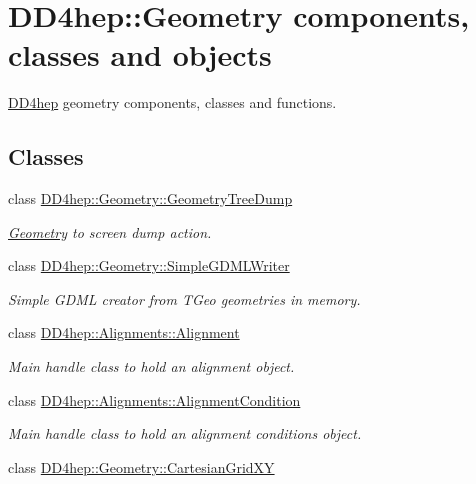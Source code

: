\hypertarget{group___d_d4_h_e_p___g_e_o_m_e_t_r_y}{
\section{DD4hep::Geometry components, classes and objects}
\label{group___d_d4_h_e_p___g_e_o_m_e_t_r_y}
}


\hyperlink{namespace_d_d4hep}{DD4hep} geometry components, classes and functions.  
\subsection*{Classes}
\begin{DoxyCompactItemize}
\item 
class \hyperlink{class_d_d4hep_1_1_geometry_1_1_geometry_tree_dump}{DD4hep::Geometry::GeometryTreeDump}
\begin{DoxyCompactList}\small\item\em \hyperlink{namespace_d_d4hep_1_1_geometry}{Geometry} to screen dump action. \item\end{DoxyCompactList}\item 
class \hyperlink{class_d_d4hep_1_1_geometry_1_1_simple_g_d_m_l_writer}{DD4hep::Geometry::SimpleGDMLWriter}
\begin{DoxyCompactList}\small\item\em Simple GDML creator from TGeo geometries in memory. \item\end{DoxyCompactList}\item 
class \hyperlink{class_d_d4hep_1_1_alignments_1_1_alignment}{DD4hep::Alignments::Alignment}
\begin{DoxyCompactList}\small\item\em Main handle class to hold an alignment object. \item\end{DoxyCompactList}\item 
class \hyperlink{class_d_d4hep_1_1_alignments_1_1_alignment_condition}{DD4hep::Alignments::AlignmentCondition}
\begin{DoxyCompactList}\small\item\em Main handle class to hold an alignment conditions object. \item\end{DoxyCompactList}\item 
class \hyperlink{class_d_d4hep_1_1_geometry_1_1_cartesian_grid_x_y}{DD4hep::Geometry::CartesianGridXY}

\end{DoxyCompactItemize}
